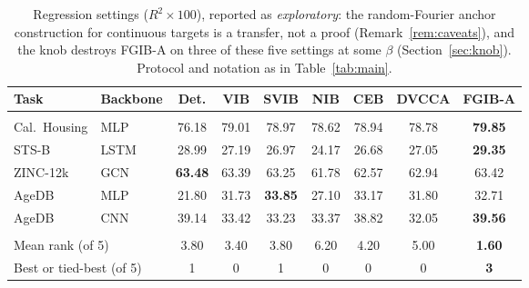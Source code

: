 \begin{table}[t]
\caption{Regression settings ($R^2\times100$), reported as \emph{exploratory}: the random-Fourier anchor construction for continuous targets is a transfer, not a proof (Remark~\ref{rem:caveats}), and the knob destroys FGIB-A on three of these five settings at some $\beta$ (Section~\ref{sec:knob}). Protocol and notation as in Table~\ref{tab:main}.}
\label{tab:main-reg}
\begin{center}\footnotesize
\begin{tabular}{llccccccc}
Task & Backbone & Det. & VIB & SVIB & NIB & CEB & DVCCA & \textbf{FGIB-A} \\ \hline \\[-1.8ex]
Cal.\ Housing & MLP & 76.18 & 79.01 & 78.97 & 78.62 & 78.94 & 78.78 & \textbf{79.85} \\
STS-B & LSTM & 28.99 & 27.19 & 26.97 & 24.17 & 26.68 & 27.05 & \textbf{29.35} \\
ZINC-12k & GCN & \textbf{63.48} & 63.39 & 63.25 & 61.78 & 62.57 & 62.94 & 63.42 \\
AgeDB & MLP & 21.80 & 31.73 & \textbf{33.85} & 27.10 & 33.17 & 31.80 & 32.71 \\
AgeDB & CNN & 39.14 & 33.42 & 33.23 & 33.37 & 38.82 & 32.05 & \textbf{39.56} \\
\hline \\[-1.8ex]
\multicolumn{2}{l}{Mean rank (of 5)} & 3.80 & 3.40 & 3.80 & 6.20 & 4.20 & 5.00 & \textbf{1.60} \\
\multicolumn{2}{l}{Best or tied-best (of 5)} & 1 & 0 & 1 & 0 & 0 & 0 & \textbf{3} \\
\end{tabular}\end{center}\end{table}
